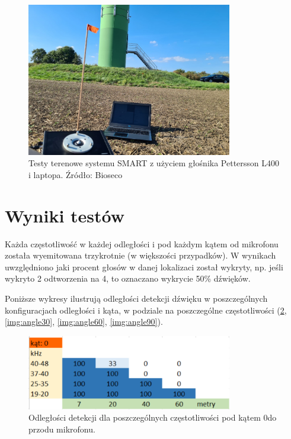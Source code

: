 \documentclass{sprz}
\begin{document}
\begin{figure}[h]
  \centering
  \includegraphics[width=0.8\textwidth]{sprz/fieldtests.png}
  \caption{Testy terenowe systemu SMART z użyciem głośnika Pettersson L400 i laptopa. Źródło: Bioseco}
  \label{img:fieldtests}
\end{figure}

\section{Wyniki testów}
Każda częstotliwość w każdej odległości i pod każdym kątem od mikrofonu została wyemitowana trzykrotnie (w większości przypadków). W wynikach uwzględniono jaki procent głosów w danej lokalizaci został wykryty, np. jeśli wykryto 2 odtworzenia na 4, to oznaczano wykrycie 50\% dźwięków.

Poniższe wykresy ilustrują odległości detekcji dźwięku w poszczególnych konfiguracjach odległości i kąta, w podziale na poszczególne częstotliwości (\ref{img:angle0}, \ref{img:angle30}, \ref{img:angle60}, \ref{img:angle90}).

  \begin{figure}[h]
    \centering
    \includegraphics[width=0.8\textwidth]{sprz/angle0.png}
    \caption{Odległości detekcji dla poszczególnych częstotliwości pod kątem 0\textdegree do przodu mikrofonu.}
    \label{img:angle0}
  \end{figure}
\clearpage
\end{document}
